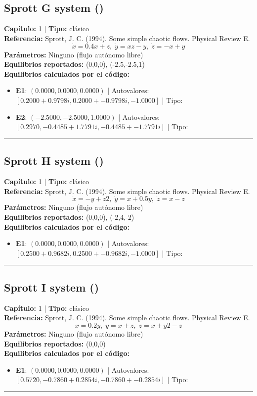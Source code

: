 \subsection*{Sprott G system ()}
\textbf{Capítulo:} 1 | \textbf{Tipo:} clásico\\
\textbf{Referencia:} Sprott, J. C. (1994). Some simple chaotic flows. Physical Review E.\\
\[\dot{x}=0.4x+z, \; \dot{y}=xz-y, \; \dot{z}=-x+y\]
\textbf{Parámetros:} Ninguno (flujo autónomo libre)\\
\textbf{Equilibrios reportados:} (0,0,0), (-2.5,-2.5,1)\\
\textbf{Equilibrios calculados por el código:}
\begin{itemize}
  \item \textbf{E1}: $(0.0000, 0.0000, 0.0000)$ | Autovalores: $[0.2000 + 0.9798i, 0.2000 + -0.9798i, -1.0000]$ | Tipo: 
  \item \textbf{E2}: $(-2.5000, -2.5000, 1.0000)$ | Autovalores: $[0.2970, -0.4485 + 1.7791i, -0.4485 + -1.7791i]$ | Tipo: 
\end{itemize}
\hrule

\subsection*{Sprott H system ()}
\textbf{Capítulo:} 1 | \textbf{Tipo:} clásico\\
\textbf{Referencia:} Sprott, J. C. (1994). Some simple chaotic flows. Physical Review E.\\
\[\dot{x}=-y+z2, \; \dot{y}=x+0.5y, \; \dot{z}=x-z\]
\textbf{Parámetros:} Ninguno (flujo autónomo libre)\\
\textbf{Equilibrios reportados:} (0,0,0), (-2,4,-2)\\
\textbf{Equilibrios calculados por el código:}
\begin{itemize}
  \item \textbf{E1}: $(0.0000, 0.0000, 0.0000)$ | Autovalores: $[0.2500 + 0.9682i, 0.2500 + -0.9682i, -1.0000]$ | Tipo: 
\end{itemize}
\hrule

\subsection*{Sprott I system ()}
\textbf{Capítulo:} 1 | \textbf{Tipo:} clásico\\
\textbf{Referencia:} Sprott, J. C. (1994). Some simple chaotic flows. Physical Review E.\\
\[\dot{x}=0.2y, \; \dot{y}=x+z, \; \dot{z}=x+y2-z\]
\textbf{Parámetros:} Ninguno (flujo autónomo libre)\\
\textbf{Equilibrios reportados:} (0,0,0)\\
\textbf{Equilibrios calculados por el código:}
\begin{itemize}
  \item \textbf{E1}: $(0.0000, 0.0000, 0.0000)$ | Autovalores: $[0.5720, -0.7860 + 0.2854i, -0.7860 + -0.2854i]$ | Tipo: 
\end{itemize}
\hrule

